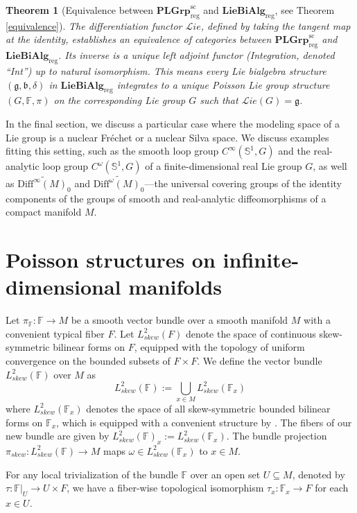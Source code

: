 \documentclass[11pt,reqno]{amsart}
\newtheorem{theorem}{Theorem}[section]
\theoremstyle{definition}
\newcommand{\CatPL}{\mathbf{PLGrp}_{\text{reg}}^{\text{sc}}}
\newcommand{\CatLB}{\mathbf{LieBiAlg}_{\text{reg}}}
\numberwithin{equation}{section}
\begin{document}
\begin{theorem}[Equivalence between $\CatPL$ and $\CatLB$, see Theorem \ref{equivalence}]
    The differentiation functor $\mathcal{L}ie$, defined by taking the tangent map at the identity, establishes an equivalence of categories between $\CatPL$ and $\CatLB$. Its inverse is a unique left adjoint functor (Integration, denoted ``Int'') up to natural isomorphism. This means every Lie bialgebra structure $(\mathfrak{g}, \mathfrak{b}, \delta)$ in $\CatLB$ integrates to a unique Poisson Lie group structure $(G, \mathbb{F}, \pi)$ on the corresponding Lie group $G$ such that $\mathcal{L}ie(G) = \mathfrak{g}$.
\end{theorem}

In the final section, we discuss a particular case where the modeling space of a Lie group is a nuclear Fréchet or a nuclear Silva space. We discuss examples fitting this setting, such as the smooth loop group $C^{\infty}(\mathbb{S}^{1}, G)$ and the real-analytic loop group $C^{\omega}(\mathbb{S}^{1}, G)$ of a finite-dimensional real Lie group $G$, as well as $\widetilde{\mathrm{Diff}^{\infty}(M)_0}$ and $\widetilde{\mathrm{Diff}^{\omega}(M)_0}$---the universal covering groups of the identity components of the groups of smooth and real-analytic diffeomorphisms of a compact manifold $M$.
\section{Poisson structures on infinite-dimensional manifolds}

Let $\pi_{\mathbb{F}}: \mathbb{F} \to M$ be a smooth vector bundle over a smooth manifold $M$ with a convenient typical fiber $F$. Let $L^2_{skew}(F)$ denote the space of continuous skew-symmetric bilinear forms on $F$, equipped with the topology of uniform convergence on the bounded subsets of $F\times F$.
We define the vector bundle $L^2_{skew}(\mathbb F)$ over $M$ as
\[ L^2_{skew}(\mathbb F):=\bigcup_{x\in M}L^2_{skew}(\mathbb F_x)\]
 where $L^2_{skew}(\mathbb F_x)$ denotes the space of all skew-symmetric bounded bilinear forms on $\mathbb F_x$, which is equipped with a convenient structure by \cite[Proposition 5.6]{20}.
The fibers of our new bundle are given by $L^2_{skew}(\mathbb{F})_x := L^2_{skew}(\mathbb{F}_x)$. The bundle projection $\pi_{skew}: L^2_{skew}(\mathbb{F}) \to M$ maps $\omega \in L^2_{skew}(\mathbb{F}_x)$ to $x \in M$.

For any local trivialization of the bundle $\mathbb{F}$ over an open set $U \subseteq M$, denoted by $\tau: \mathbb{F}|_U \to U \times F$, we have a fiber-wise topological isomorphism $\tau_x: \mathbb{F}_x \to F$ for each $x \in U$.
\end{document}

